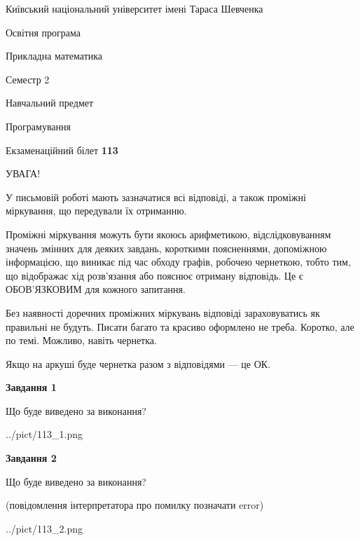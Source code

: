 \documentclass[12pt, ukrainian]{article}
\begin{document}
{{\begin {small}\par
{ \center  Київський національний університет імені Тараса Шевченка \par}
{\parbox {5 cm}{Освітня програма \hfill}{\parbox {7 cm}{Прикладна математика\hfill}}\parbox {6 cm}{\hfill Семестр 2}}\par
{\parbox {5 cm} {Навчальний предмет \hfill}\parbox {7 cm}{Програмування \hfill}\parbox {6cm}{\hfill}\par}\vspace{-7pt} \end{small}}{\center Екзаменаційний білет \No \textbf
{ 113 }\par}}
{
\begin {large}
УВАГА!

У письмовій роботі мають зазначатися всі відповіді, а також проміжні міркування, що передували їх отриманню.

Проміжні міркування можуть бути якоюсь арифметикою, відслідковуванням зна\-чень змінних для деяких завдань,
короткими поясненнями, допоміжною інформацією, що виникає під час обходу графів, робочею чернеткою,
тобто тим, що відображає хід розв’язання або пояснює отриману відповідь.
Це є ОБОВ’ЯЗКОВИМ для кожного запитання.

Без наявності доречних проміжних міркувань відповіді зараховуватись як правиль\-ні не будуть.
Писати багато та красиво оформлено не треба. Коротко, але по темі. Можли\-во, навіть чернетка.

Якщо на аркуші буде чернетка разом з відповідями --- це ОК.

\newpage

{\begin {center}\textbf{Завдання 1}\end {center}}\par
Що буде виведено за виконання?\par
\begin{center}
	{../pict/113_1.png}
\end{center}
\newpage

{\begin {center}\textbf{Завдання 2}\end {center}}\par
Що буде виведено за виконання?\par
 (повідомлення інтерпретатора про помилку позначати error)\par
\begin{center}
	{../pict/113_2.png}
\end{center}
\newpage


\end{large}}
\end{document}
